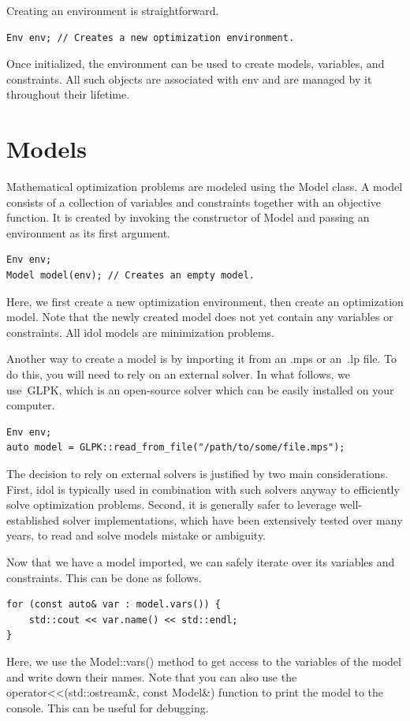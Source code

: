 Creating an environment is straightforward.
%
\begin{lstlisting}
Env env; // Creates a new optimization environment.
\end{lstlisting}%
%
Once initialized, the environment can be used to create models, variables, and
constraints. All such objects are associated with \textsf{env} and are managed
by it throughout their lifetime.

\section{Models}

Mathematical optimization problems are modeled using the \textsf{Model} class.
A model consists of a collection of variables and constraints together with an
objective function. It is created by invoking the constructor of
\textsf{Model} and passing an environment as its first argument.
%
\begin{lstlisting}
Env env;
Model model(env); // Creates an empty model.
\end{lstlisting}

Here, we first create a new optimization environment, then create an
optimization model. Note that the newly created model does not yet contain any
variables or constraints. All \textsf{idol} models are minimization problems.

Another way to create a model is by importing it from an \textsf{.mps} or
an~\textsf{.lp} file. To do this, you will need to rely on an external solver.
In what follows, we use~\textsf{GLPK}, which is an open-source solver which
can be easily installed on your computer.
%
\begin{lstlisting}
Env env;
auto model = GLPK::read_from_file("/path/to/some/file.mps");
\end{lstlisting}

The decision to rely on external solvers is justified by two main
considerations. First, \textsf{idol} is typically used in combination with
such solvers anyway to efficiently solve optimization problems. Second, it is
generally safer to leverage well-established solver implementations, which
have been extensively tested over many years, to read and solve models mistake
or ambiguity.

Now that we have a model imported, we can safely iterate over its variables
and constraints. This can be done as follows. 
%
\begin{lstlisting}
for (const auto& var : model.vars()) {
    std::cout << var.name() << std::endl;
}
\end{lstlisting}
Here, we use the \textsf{Model::vars()} method to get access to the variables
of the model and write down their names. Note that you can also use the
\textsf{operator<<(std::ostream\&, const Model\&)} function to print the model
to the console. This can be useful for debugging. 

